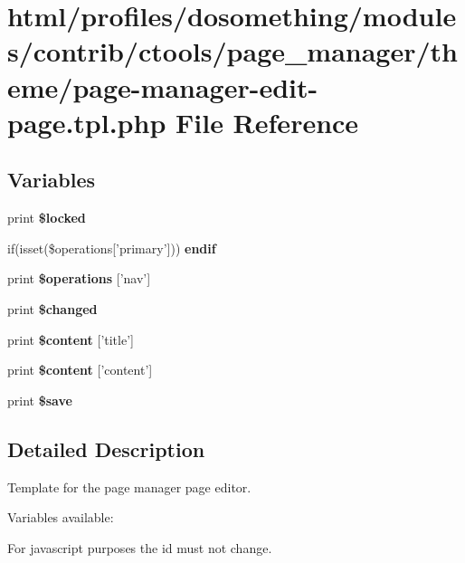 \hypertarget{page-manager-edit-page_8tpl_8php}{
\section{html/profiles/dosomething/modules/contrib/ctools/page\_\-manager/theme/page-\/manager-\/edit-\/page.tpl.php File Reference}
\label{page-manager-edit-page_8tpl_8php}
}
\subsection*{Variables}
\begin{DoxyCompactItemize}
\item 
\hypertarget{page-manager-edit-page_8tpl_8php_ac23d363ff388a9041399d5367c91ce3b}{
print {\bfseries \$locked}}
\label{page-manager-edit-page_8tpl_8php_ac23d363ff388a9041399d5367c91ce3b}

\item 
\hypertarget{page-manager-edit-page_8tpl_8php_a7b14151aef3ac707d7efd2d664a25fa4}{
if(isset(\$operations\mbox{[}'primary'\mbox{]})) {\bfseries endif}}
\label{page-manager-edit-page_8tpl_8php_a7b14151aef3ac707d7efd2d664a25fa4}

\item 
\hypertarget{page-manager-edit-page_8tpl_8php_a07f5ab5f65ccb6165520bd8cc9c24fe7}{
print {\bfseries \$operations} \mbox{[}'nav'\mbox{]}}
\label{page-manager-edit-page_8tpl_8php_a07f5ab5f65ccb6165520bd8cc9c24fe7}

\item 
\hypertarget{page-manager-edit-page_8tpl_8php_a1b534151dedeea3b32162cb539716d2c}{
print {\bfseries \$changed}}
\label{page-manager-edit-page_8tpl_8php_a1b534151dedeea3b32162cb539716d2c}

\item 
\hypertarget{page-manager-edit-page_8tpl_8php_a2cbacd6c68405e8688008be7a3f71b8d}{
print {\bfseries \$content} \mbox{[}'title'\mbox{]}}
\label{page-manager-edit-page_8tpl_8php_a2cbacd6c68405e8688008be7a3f71b8d}

\item 
\hypertarget{page-manager-edit-page_8tpl_8php_ac4c1b4ecaa87833cf7bd4ca360266b08}{
print {\bfseries \$content} \mbox{[}'content'\mbox{]}}
\label{page-manager-edit-page_8tpl_8php_ac4c1b4ecaa87833cf7bd4ca360266b08}

\item 
\hypertarget{page-manager-edit-page_8tpl_8php_a5cf5fafd36698d0894740b7dcdfee450}{
print {\bfseries \$save}}
\label{page-manager-edit-page_8tpl_8php_a5cf5fafd36698d0894740b7dcdfee450}

\end{DoxyCompactItemize}


\subsection{Detailed Description}
Template for the page manager page editor.

Variables available:
\begin{DoxyItemize}
\item For javascript purposes the id must not change. 
\end{DoxyItemize}